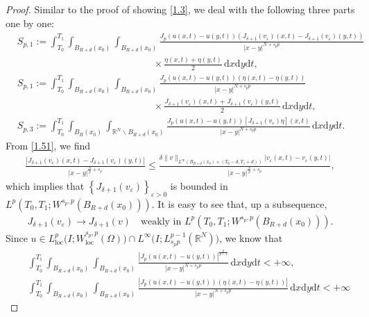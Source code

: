\documentclass[10pt,a4paper]{amsart}
\begin{document}
\begin{proof}
	Similar to the proof of showing \eqref{1.3}, we deal with the following three parts one by one:
	\begin{align*}
		&S_{p,1}:=\int_{T_0}^{T_1}\int_{B_{R+d}(x_0)}\int_{B_{R+d}(x_0)}\frac{J_p\left( u(x,t)-u(y,t)\right)\left( J_{\delta+1}(v_\varepsilon)(x,t)-J_{\delta+1}(v_\varepsilon)(y,t)\right)}{|x-y|^{N+s_pp}}\\
		&\qquad\qquad\qquad\qquad\qquad\qquad\qquad\times\frac{\eta(x,t)+\eta(y,t)}{2}\,\mathrm{d}x\mathrm{d}y\mathrm{d}t,\\
		&S_{p,1}:=\int_{T_0}^{T_1}\int_{B_{R+d}(x_0)}\int_{B_{R+d}(x_0)}\frac{J_p\left( u(x,t)-u(y,t)\right)\left( \eta(x,t)-\eta(y,t)\right)}{|x-y|^{N+s_pp}}\\
		&\qquad\qquad\qquad\qquad\qquad\qquad\qquad\times\frac{J_{\delta+1}(v_\varepsilon)(x,t)+J_{\delta+1}(v_\varepsilon)(y,t)}{2}\,\mathrm{d}x\mathrm{d}y\mathrm{d}t,\\
		&S_{p,3}:=\int_{T_0}^{T_1}\int_{B_{R}(x_0)}\int_{\mathbb{R}^N\backslash B_{R+d}(x_0)}\frac{J_p\left( u(x,t)-u(y,t)\right)\left[ J_{\delta+1}(v_\varepsilon)\eta\right](x,t)}{|x-y|^{N+s_pp}}\,\mathrm{d}x\mathrm{d}y\mathrm{d}t.
	\end{align*}
	From \eqref{1.51}, we find
	\begin{align*}
		\frac{\left| J_{\delta+1}(v_\varepsilon)(x,t)-J_{\delta+1}(v_\varepsilon)(y,t)\right| }{|x-y|^{\frac{N}{p}+s_p}}\le \frac{\delta\|v\|_{L^\infty\left( B_{R+d}(x_0)\times(T_0-d,T_1+d)\right)}\left|v_\varepsilon(x,t)-v_\varepsilon(y,t)\right| }{|x-y|^{\frac{N}{p}+s_p}},
	\end{align*}
	which implies that $\left\lbrace J_{\delta+1}(v_\varepsilon)\right\rbrace_{\varepsilon>0} $ is bounded in $L^p\left( T_0,T_1;W^{s_p,p}(B_{R+d}(x_0))\right)$. It is easy to see that, up a subsequence,
	\begin{align}
		\label{1.7}
		J_{\delta+1}(v_\varepsilon)\rightarrow J_{\delta+1}(v)\quad\text{weakly in }L^p\left( T_0,T_1;W^{s_p,p}(B_{R+d}(x_0))\right). 
	\end{align}
	Since $u\in L^p_\mathrm{loc}\bigl(I;W^{s_p,p}_\mathrm{loc}(\Omega)\bigl)\cap L^\infty\bigl(I;L^{p-1}_{s_pp}(\mathbb{R}^N)\bigl)$, we know that
	\begin{align*}
			&\quad\int_{T_0}^{T_1}\int_{B_{R+d}(x_0)}\int_{B_{R+d}(x_0)}\frac{\left| J_p\left(u(x,t)-u(y,t)\right)\right|^{\frac{p}{p-1}}}{|x-y|^{N+s_pp}}\,\mathrm{d}x\mathrm{d}y\mathrm{d}t<+\infty,\\
			&\quad\int_{T_0}^{T_1}\int_{B_{R+d}(x_0)}\int_{B_{R+d}(x_0)}\frac{\left| J_p\left(u(x,t)-u(y,t)\right)(\eta(x,t)-\eta(y,t))\right|}{|x-y|^{N+s_pp}}\,\mathrm{d}x\mathrm{d}y\mathrm{d}t<+\infty

\end{align*}
\end{proof}
\end{document}
